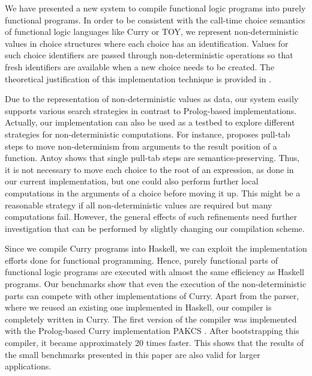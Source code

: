 \documentclass{llncs}
\begin{document}
We have presented a new system to compile functional logic programs
into purely functional programs.
In order to be consistent with the call-time choice semantics
of functional logic languages like Curry or TOY,
we represent non-deterministic values
in choice structures where each choice has an identification.
Values for such choice identifiers are passed through
non-deterministic operations so that fresh identifiers are available
when a new choice needs to be created.
The theoretical justification of this implementation technique
is provided in \cite{Brassel11Thesis}.

Due to the representation of non-deterministic values as data,
our system easily supports various search strategies
in contrast to Prolog-based implementations.
Actually, our implementation can also be used as a testbed
to explore different strategies for non-deterministic computations.
For instance, \cite{AlqaddoumiAntoyFischerReck10} proposes
pull-tab steps to move non-determinism from arguments to
the result position of a function. Antoy \cite{Antoy11ICLP}
shows that single pull-tab steps are semantics-preserving.
Thus, it is not necessary to move each choice to the root
of an expression, as done in our current implementation,
but one could also perform further local computations in the arguments
of a choice before moving it up. This might be a reasonable strategy
if all non-deterministic values are required but many computations fail.
However, the general effects of such refinements need further
investigation that can be performed by slightly changing our
compilation scheme.

Since we compile Curry programs into Haskell,
we can exploit the implementation efforts done
for functional programming.
Hence, purely functional parts of functional logic programs
are executed with almost the same efficiency as Haskell programs.
Our benchmarks show that even the execution of the
non-deterministic parts can compete with other
implementations of Curry.
Apart from the parser, where we reused an existing one
implemented in Haskell, our compiler is completely written in Curry.
The first version of the compiler was implemented
with the Prolog-based Curry implementation PAKCS \cite{Hanus10PAKCS}.
After bootstrapping this compiler, it became approximately 20 times
faster. This shows that the results of the small benchmarks
presented in this paper are also valid for larger applications.
\end{document}
